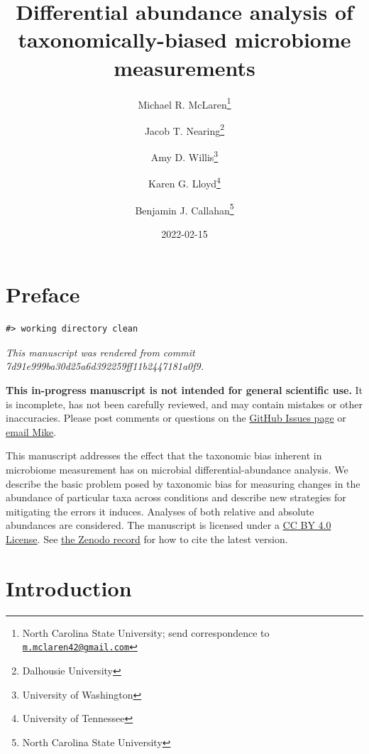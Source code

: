 \documentclass[
]{article}
\title{Differential abundance analysis of taxonomically-biased microbiome measurements}
\author{Michael R. McLaren\footnote{North Carolina State University; send correspondence to \href{mailto:m.mclaren42@gmail.com}{\nolinkurl{m.mclaren42@gmail.com}}} \and Jacob T. Nearing\footnote{Dalhousie University} \and Amy D. Willis\footnote{University of Washington} \and Karen G. Lloyd\footnote{University of Tennessee} \and Benjamin J. Callahan\footnote{North Carolina State University}}
\date{2022-02-15}
\begin{document}
\maketitle

{
\setcounter{tocdepth}{2}
\tableofcontents
}
\hypertarget{preface}{%
\section*{Preface}\label{preface}}

\begin{verbatim}
#> working directory clean
\end{verbatim}

\emph{This manuscript was rendered from commit 7d91e999ba30d25a6d392259ff11b2447181a0f9.}

\leavevmode{}%
\textbf{This in-progress manuscript is not intended for general scientific use.}
It is incomplete, has not been carefully reviewed, and may contain mistakes or other inaccuracies.
Please post comments or questions on the \href{https://github.com/mikemc/differential-abundance-theory/issues}{GitHub Issues page} or \href{m.mclaren42@gmail.com}{email Mike}.

This manuscript addresses the effect that the taxonomic bias inherent in microbiome measurement has on microbial differential-abundance analysis.
We describe the basic problem posed by taxonomic bias for measuring changes in the abundance of particular taxa across conditions and describe new strategies for mitigating the errors it induces.
Analyses of both relative and absolute abundances are considered.
The manuscript is licensed under a \href{https://creativecommons.org/licenses/by/4.0/}{CC BY 4.0 License}.
See \href{https://doi.org/10.5281/zenodo.4552717}{the Zenodo record} for how to cite the latest version.

\hypertarget{introduction}{%
\section{Introduction}\label{introduction}}
\end{document}
